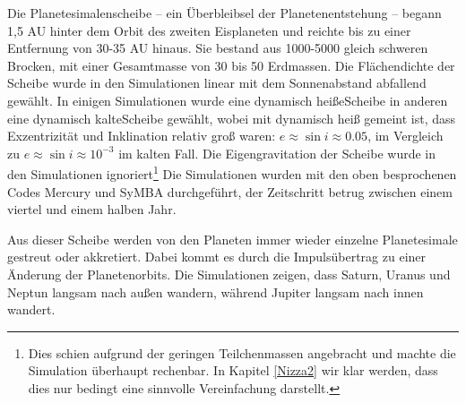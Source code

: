 \documentclass[12pt,a4paper,twoside]{article}
\begin{document}
Die Planetesimalenscheibe – ein Überbleibsel der Planetenentstehung – begann 1,5 AU hinter dem Orbit des zweiten Eisplaneten und reichte bis zu einer Entfernung von 30-35 AU hinaus\cite{Tsiganis2005,Levison2008}. Sie bestand aus 1000-5000 gleich schweren Brocken, mit einer Gesamtmasse von 30 bis 50 Erdmassen. %
Die Flächendichte der Scheibe wurde in den Simulationen linear mit dem Sonnenabstand abfallend gewählt. In einigen Simulationen wurde eine \glqq dynamisch heiße\grqq Scheibe in anderen eine \glqq dynamisch kalte\grqq Scheibe gewählt, wobei mit dynamisch heiß gemeint ist, dass Exzentrizität und Inklination relativ groß waren: $e \approx \sin i \approx 0.05 $, im Vergleich zu $e \approx \sin i \approx 10^{-3} $ im kalten Fall\cite{Tsiganis2005}.
Die Eigengravitation der Scheibe wurde in den Simulationen ignoriert\cite{Tsiganis2005}\footnote{Dies schien aufgrund der geringen Teilchenmassen angebracht und machte die Simulation überhaupt rechenbar. In Kapitel \ref{Nizza2} wir klar werden, dass dies nur bedingt eine sinnvolle Vereinfachung darstellt.}
Die Simulationen wurden mit den oben besprochenen Codes Mercury und SyMBA durchgeführt,
der Zeitschritt betrug zwischen einem viertel und einem halben Jahr\cite{Tsiganis2005}.

Aus dieser Scheibe werden von den Planeten immer wieder einzelne Planetesimale gestreut oder akkretiert. Dabei kommt es durch die Impulsübertrag zu einer Änderung der Planetenorbits\cite{Tsiganis2005}. %
Die Simulationen zeigen, dass Saturn, Uranus und Neptun langsam nach außen wandern, während Jupiter langsam nach innen wandert\cite{Hahn1999,Tsiganis2005}.
\end{document}
